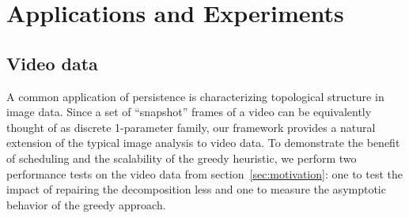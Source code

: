 \documentclass[sn-mathphys]{sn-jnl}
\begin{document}


\section{Applications and Experiments}\label{sec:results}
\subsection{Video data}
A common application of persistence is characterizing topological structure in image data. Since a  set of ``snapshot'' frames of a video can be equivalently thought of as discrete 1-parameter family, our framework provides a natural extension of the typical image analysis to video data. 
To demonstrate the benefit of scheduling and the scalability of the greedy heuristic, we perform two performance tests on the video data from section~\ref{sec:motivation}: one to test the impact of repairing the decomposition less and one to measure the asymptotic behavior of the greedy approach.
\end{document}
